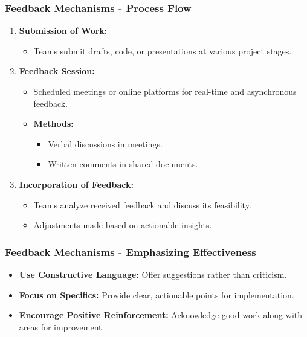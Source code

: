 \documentclass{beamer}
\begin{document}
\begin{frame}[fragile]
    \frametitle{Feedback Mechanisms - Process Flow}
    \begin{enumerate}
        \item \textbf{Submission of Work:}
            \begin{itemize}
                \item Teams submit drafts, code, or presentations at various project stages.
            \end{itemize}
        \item \textbf{Feedback Session:}
            \begin{itemize}
                \item Scheduled meetings or online platforms for real-time and asynchronous feedback.
                \item \textbf{Methods:}
                    \begin{itemize}
                        \item Verbal discussions in meetings.
                        \item Written comments in shared documents.
                    \end{itemize}
            \end{itemize}
        \item \textbf{Incorporation of Feedback:}
            \begin{itemize}
                \item Teams analyze received feedback and discuss its feasibility.
                \item Adjustments made based on actionable insights.
            \end{itemize}
    \end{enumerate}
\end{frame}

\begin{frame}[fragile]
    \frametitle{Feedback Mechanisms - Emphasizing Effectiveness}
    \begin{itemize}
        \item \textbf{Use Constructive Language:} Offer suggestions rather than criticism.
        \item \textbf{Focus on Specifics:} Provide clear, actionable points for implementation.
        \item \textbf{Encourage Positive Reinforcement:} Acknowledge good work along with areas for improvement.
    \end{itemize}
\end{frame}
\end{document}
